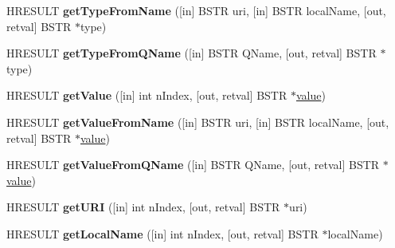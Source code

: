 \begin{DoxyCompactItemize}
H\+R\+E\+S\+U\+LT {\bfseries get\+Type\+From\+Name} (\mbox{[}in\mbox{]} B\+S\+TR uri, \mbox{[}in\mbox{]} B\+S\+TR local\+Name, \mbox{[}out, retval\mbox{]} B\+S\+TR $\ast$type)
\item 
\mbox{\label{interface_m_s_x_m_l2_1_1_i_v_b_s_a_x_attributes_a3b90587d1748c98bc219044f2137ab3b}} 
H\+R\+E\+S\+U\+LT {\bfseries get\+Type\+From\+Q\+Name} (\mbox{[}in\mbox{]} B\+S\+TR Q\+Name, \mbox{[}out, retval\mbox{]} B\+S\+TR $\ast$type)
\item 
\mbox{\label{interface_m_s_x_m_l2_1_1_i_v_b_s_a_x_attributes_a8b181c19910c7782c0c7af280e0c53ad}} 
H\+R\+E\+S\+U\+LT {\bfseries get\+Value} (\mbox{[}in\mbox{]} int n\+Index, \mbox{[}out, retval\mbox{]} B\+S\+TR $\ast$\hyperlink{unionvalue}{value})
\item 
\mbox{\label{interface_m_s_x_m_l2_1_1_i_v_b_s_a_x_attributes_a55341240b3ee14099a30778c725892cc}} 
H\+R\+E\+S\+U\+LT {\bfseries get\+Value\+From\+Name} (\mbox{[}in\mbox{]} B\+S\+TR uri, \mbox{[}in\mbox{]} B\+S\+TR local\+Name, \mbox{[}out, retval\mbox{]} B\+S\+TR $\ast$\hyperlink{unionvalue}{value})
\item 
\mbox{\label{interface_m_s_x_m_l2_1_1_i_v_b_s_a_x_attributes_a5d12838d49c43aa60cdfb945c32debea}} 
H\+R\+E\+S\+U\+LT {\bfseries get\+Value\+From\+Q\+Name} (\mbox{[}in\mbox{]} B\+S\+TR Q\+Name, \mbox{[}out, retval\mbox{]} B\+S\+TR $\ast$\hyperlink{unionvalue}{value})
\item 
\mbox{\label{interface_m_s_x_m_l2_1_1_i_v_b_s_a_x_attributes_a32838b56e0368596f816f4c2cfbaa8dd}} 
H\+R\+E\+S\+U\+LT {\bfseries get\+U\+RI} (\mbox{[}in\mbox{]} int n\+Index, \mbox{[}out, retval\mbox{]} B\+S\+TR $\ast$uri)
\item 
\mbox{\label{interface_m_s_x_m_l2_1_1_i_v_b_s_a_x_attributes_a47c76aac29b5ec0dfe0ec9c0a2dd35c8}} 
H\+R\+E\+S\+U\+LT {\bfseries get\+Local\+Name} (\mbox{[}in\mbox{]} int n\+Index, \mbox{[}out, retval\mbox{]} B\+S\+TR $\ast$local\+Name)
\item 
\mbox{\label{interface_m_s_x_m_l2_1_1_i_v_b_s_a_x_attributes_a3ceb46d592ed3e6ab8c209bfff90b08b}} 

\end{DoxyCompactItemize}
